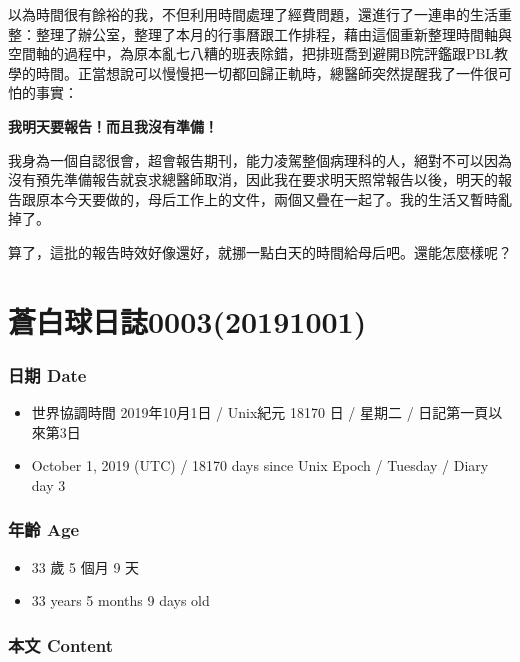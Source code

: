 \documentclass[a5paper, 12pt
]{book}
\providecommand{\tightlist}{%
  \setlength{\itemsep}{0pt}\setlength{\parskip}{0pt}}
\begin{document}
以為時間很有餘裕的我，不但利用時間處理了經費問題，還進行了一連串的生活重整：整理了辦公室，整理了本月的行事曆跟工作排程，藉由這個重新整理時間軸與空間軸的過程中，為原本亂七八糟的班表除錯，把排班喬到避開B院評鑑跟PBL教學的時間。正當想說可以慢慢把一切都回歸正軌時，總醫師突然提醒我了一件很可怕的事實：

\textbf{我明天要報告！而且我沒有準備！}

我身為一個自認很會，超會報告期刊，能力凌駕整個病理科的人，絕對不可以因為沒有預先準備報告就哀求總醫師取消，因此我在要求明天照常報告以後，明天的報告跟原本今天要做的，母后工作上的文件，兩個又疊在一起了。我的生活又暫時亂掉了。

算了，這批的報告時效好像還好，就挪一點白天的時間給母后吧。還能怎麼樣呢？

\hypertarget{ux84bcux767dux7403ux65e5ux8a8c000320191001}{%
\section{蒼白球日誌0003(20191001)}\label{ux84bcux767dux7403ux65e5ux8a8c000320191001}}

\hypertarget{ux65e5ux671f-date-2}{%
\subsubsection{日期 Date}\label{ux65e5ux671f-date-2}}

\begin{itemize}
\tightlist
\item
  世界協調時間 2019年10月1日 / Unix紀元 18170 日 / 星期二 /
  日記第一頁以來第3日
\item
  October 1, 2019 (UTC) / 18170 days since Unix Epoch / Tuesday / Diary
  day 3
\end{itemize}

\hypertarget{ux5e74ux9f61-age-2}{%
\subsubsection{年齡 Age}\label{ux5e74ux9f61-age-2}}

\begin{itemize}
\tightlist
\item
  33 歲 5 個月 9 天
\item
  33 years 5 months 9 days old
\end{itemize}

\hypertarget{ux672cux6587-content-2}{%
\subsubsection{本文 Content}\label{ux672cux6587-content-2}}
\end{document}
